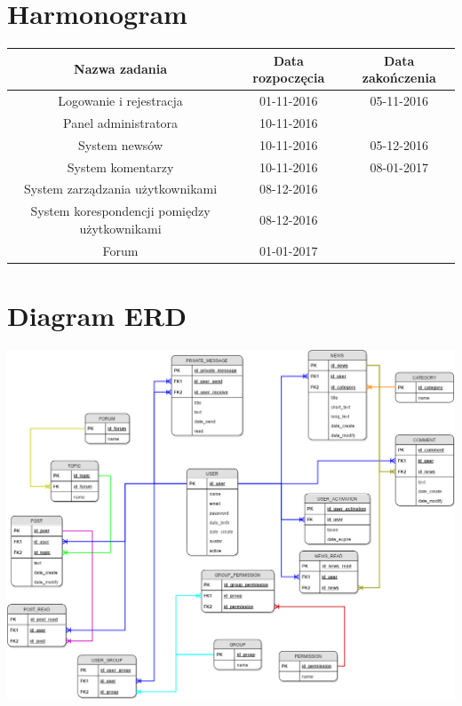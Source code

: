\documentclass[12pt,oneside]{article}
\begin{document}
\section{Harmonogram}
\begin{tabular}{|c|c|c|}
	\hline \textbf{Nazwa zadania} & \textbf{Data rozpoczęcia} & \textbf{Data zakończenia} \\ 
	\hline Logowanie i rejestracja & 01-11-2016 & 05-11-2016 \\ 
	\hline Panel administratora & 10-11-2016 &  \\ 
	\hline System newsów & 10-11-2016 & 05-12-2016 \\ 
	\hline System komentarzy & 10-11-2016 & 08-01-2017 \\
	\hline System zarządzania użytkownikami & 08-12-2016 &  \\ 
	\hline System korespondencji pomiędzy użytkownikami & 08-12-2016 &  \\ 
	\hline Forum & 01-01-2017 &  \\ 
	\hline 
\end{tabular} 
\section{Diagram ERD}
	\includegraphics[width=1\textwidth]{erd3.png}
\end{document}

